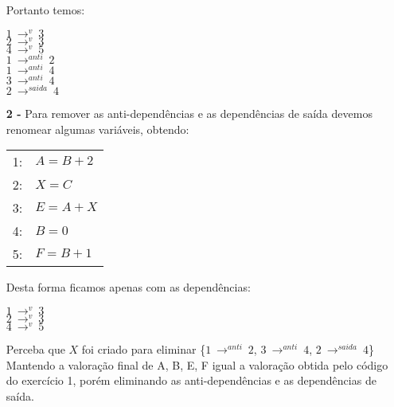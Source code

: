 \documentclass[12pt]{article}
\begin{document}
\begin{itemize}
			Portanto temos:\\
			\begin{center}
				$1 \ \longrightarrow^v \ 3$\\
				$2 \ \longrightarrow^v \ 3$\\
				$4 \ \longrightarrow^v \ 5$\\
				\hfill\newline
				$1 \ \longrightarrow^{anti} \ 2$\\
				$1 \ \longrightarrow^{anti} \ 4$\\
				$3 \ \longrightarrow^{anti} \ 4$\\
				\hfill\newline
				$2 \ \longrightarrow^{saida} \ 4$\\
			\end{center}
		\item[\textbf{2 -}]
			\hfill\newline
			Para remover as anti-dependências e as dependências de saída  devemos
			renomear algumas variáveis, obtendo:
			\begin{center}
				\begin{tabular}{cl}
					1: & $A = B + 2$\\
					2: & $X = C$\\
					3: & $E = A + X$\\
					4: & $B = 0$\\
					5: & $F = B + 1$\\		
				\end{tabular}			
			\end{center}
			Desta forma ficamos apenas com as dependências:
			\begin{center}
				$1 \ \longrightarrow^v \ 3$\\
				$2 \ \longrightarrow^v \ 3$\\
				$4 \ \longrightarrow^v \ 5$\\
			\end{center}
			Perceba que $X$ foi criado para eliminar \{$1 \ \longrightarrow^{anti} \ 2$,
			$3 \ \longrightarrow^{anti} \ 4$, $2 \ \longrightarrow^{saida} \ 4$\}\\
			Mantendo a valoração final de {A, B, E, F} igual a valoração obtida pelo
			código do exercício 1, porém eliminando as anti-dependências e as 
			dependências de saída.
	\end{itemize}
\end{document}

